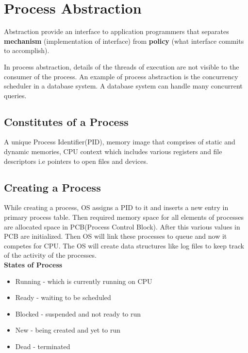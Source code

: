 \documentclass{article}
\begin{document}
\section{Process Abstraction}
Abstraction provide an interface to application programmers that separates \textbf{mechanism} (implementation of interface) from \textbf{policy} (what interface commits to accomplish).

In process abstraction, details of the threads of execution are not visible to the consumer of the process. An example of process abstraction is the concurrency scheduler in a database system. A database system can handle many concurrent queries.
\subsection{Constitutes of a Process}
A unique Process Identifier(PID), memory image that comprises of static and dynamic memories, CPU context which includes various registers and file descriptors i.e pointers to open files and devices.
\subsection{Creating a Process}
While creating a process, OS assigns a PID to it and inserts a new entry in primary process table. Then required memory space for all elements of processes are allocated space in PCB(Process Control Block). After this various values in PCB are initialized. Then OS will link these processes to queue and now it competes for CPU. The OS will create data structures like log files to keep track of the activity of the processes. \\
\textbf{States of Process}
\begin{itemize}
    \item Running - which is currently running on CPU
    \item Ready - waiting to be scheduled
    \item Blocked - suspended and not ready to run
    \item New - being created and yet to run
    \item Dead - terminated
\end{itemize}
\end{document}
